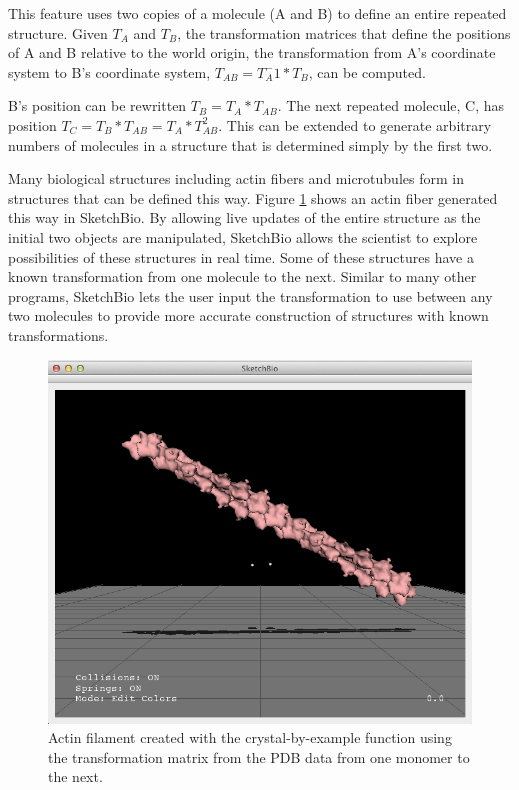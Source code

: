 \documentclass[twocolumn]{bmcart}%
\begin{document}
This feature uses two copies of a molecule (A and B) to define an entire repeated structure.  Given $T_A$ and $T_B$, the transformation matrices that define the positions of A and B relative to the world origin, the transformation from A's coordinate system to B's coordinate system, $T_{AB} = T_A^-1*T_B$, can be computed.

B's position can be rewritten $T_B = T_A*T_{AB}$.  The next repeated molecule, C, has position $T_C = T_B*T_{AB} = T_A*T_{AB}^2$.  This can be extended to generate arbitrary numbers of molecules in a structure that is determined simply by the first two.

Many biological structures including actin fibers and microtubules form in structures that can be defined this way.  Figure \ref{fig:crystal_actin} shows an actin fiber generated this way in SketchBio.  By allowing live updates of the entire structure as the initial two objects are manipulated, SketchBio allows the scientist to explore possibilities of these structures in real time.  Some of these structures have a known transformation from one molecule to the next.  Similar to many other programs, SketchBio lets the user input the transformation to use between any two molecules to provide more accurate construction of structures with known transformations.

\begin{figure}[h]
\centering
\includegraphics[width=0.9\columnwidth]{crystal_actin.png}
\caption{Actin filament created with the crystal-by-example function using the transformation matrix from the PDB data from one monomer to the next.}
\label{fig:crystal_actin}
\end{figure}
\end{document}
